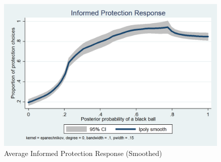 \documentclass[11pt,a4paper]{article}
\begin{document}
\begin{figure}[H]
\centering
\caption{Average Informed Protection Response (Smoothed)} \label{Informed Protection Responses}

  \centering
  \includegraphics[scale=0.3]{Graphs/ip_response_lpoly.png}

\end{figure}
\end{document}
